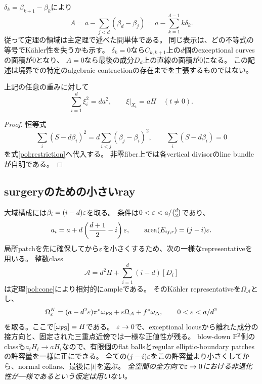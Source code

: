 $\delta_k=\beta_{k+1}-\beta_k$により
\[
A=a-\sum_{j<d}(\beta_d-\beta_j)
=a-\sum_{k=1}^{d-1}k\delta_k.
\]
従って定理の領域は主定理で述べた開単体である。
同じ表示は、どの不等式の等号でKähler性を失うかも示す。
$\delta_k=0$なら$C_{k,k+1}$上の$d$個のexceptional curvesの面積が0となり、
$A=0$なら最後の成分$D_d$上の直線の面積が0になる。
この記述は境界での特定のalgebraic contractionの存在までを主張するものではない。

\begin{corollary}\label{pol:volume}
上記の任意の重みに対して
\[
\sum_{i=1}^d\xi_i^2=da^2,
\qquad \xi|_{X_t}=aH\quad(t\ne0).
\]
\end{corollary}
\begin{proof}
恒等式
\[
\sum_i(S-d\beta_i)^2=d\sum_{i<j}(\beta_j-\beta_i)^2,
\qquad\sum_i(S-d\beta_i)=0
\]
を式\eqref{pol:restriction}へ代入する。
非零fiber上では各vertical divisorのline bundleが自明である。
\end{proof}

\subsection{surgeryのための小さいray}
大域構成には$\beta_i=(i-d)\varepsilon$を取る。
条件は$0<\varepsilon<a/\binom d2$であり、
\[
a_i=a+d\left(\frac{d+1}{2}-i\right)\varepsilon,
\qquad \operatorname{area}(E_{ij,r})=(j-i)\varepsilon.
\]
局所patchを先に確保してから$\varepsilon$を小さくするため、次の一様なrepresentativeを用いる。
整数class
\[
\mathcal A=d^2H+\sum_{i=1}^d(i-d)[D_i]
\]
は定理\ref{pol:cone}により相対的にampleである。
そのKähler representativeを$\Omega_{\mathcal A}$とし、
\[
\Omega_\varepsilon^K=(a-d^2\varepsilon)\pi^*\omega_{\rm FS}
+\varepsilon\Omega_{\mathcal A}+f^*\omega_\Delta,
\qquad 0<\varepsilon<a/d^2
\]
を取る。ここで$[\omega_{\rm FS}]=H$である。
$\varepsilon\to0$で、exceptional locusから離れた成分の接方向と、固定された三重点近傍では一様な正値性が残る。
blow-down $\mathbb P^2$側のclassも$a_iH_i\to aH_i$なので、有限個のflat ballsとregular elliptic-boundary patchesの許容量を一様に正にできる。
全ての$(j-i)\varepsilon$をこの許容量より小さくしてから、normal collars、最後に$|t|$を選ぶ。
\emph{全空間の全方向で$\varepsilon\to0$における非退化性が一様であるという仮定は用いない。}

